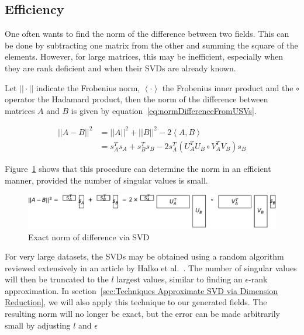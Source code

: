 \documentclass[ijgi,article,submit,moreauthors,pdftex,10pt,a4paper]{Definitions/mdpi}
\begin{document}
\subsection{Efficiency}
\label{sec:Introduction/Efficiency}

One often wants to find the norm of the difference between two fields. This can be done by subtracting one matrix from the other and summing the square of the elements. However, for large matrices, this may be inefficient, especially when they are rank deficient and when their SVDs are already known.

Let $|| \cdot ||$ indicate the Frobenius norm, $\left\langle \cdot \right\rangle$ the Frobenius inner product and the $\circ$ operator the Hadamard product, then the norm of the difference between matrices $A$ and $B$ is given by equation~\ref{eq:normDifferenceFromUSVs}.

\begin{equation}
\label{eq:normDifferenceFromUSVs}
\begin{split}
||A-B||^{2} & = ||A||^{2} + ||B||^{2} - 2 \left\langle A, B \right\rangle \\
& = s_{A}^{T} s_{A} + s_{B}^{T} s_{B} - 2 s_{A}^{T} \left( U_{A}^{T} U_{B} \circ V_{A}^{T} V_{B} \right) s_{B}
\end{split}
\end{equation}

Figure~\ref{fig:normDifferenceFromUSVs} shows that this procedure can determine the norm in an efficient manner, provided the number of singular values is small.

\begin{figure}[H]
\centering
\includegraphics[width=130mm]{Results/normDifferenceFromUSVs.pdf}
\caption[Exact norm of difference]{Exact norm of difference via SVD}
\label{fig:normDifferenceFromUSVs}
\end{figure}

For very large datasets, the SVDs may be obtained using a random algorithm reviewed extensively in an article by Halko et al.~\cite{Halko2011}. The number of singular values will then be truncated to the $l$ largest values, similar to finding an $\epsilon$-rank approximation. In section~\ref{sec:Techniques Approximate SVD via Dimension Reduction}, we will also apply this technique to our generated fields. The resulting norm will no longer be exact, but the error can be made arbitrarily small by adjusting $l$ and $\epsilon$
\end{document}
